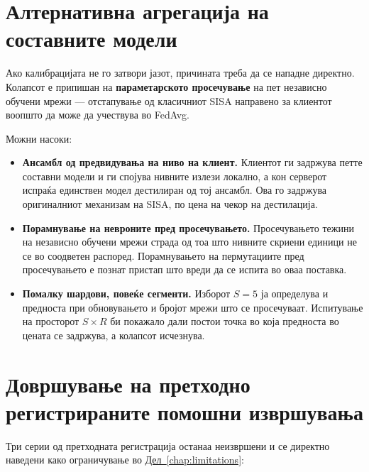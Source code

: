 \section{Алтернативна агрегација на составните модели}

Ако калибрацијата не го затвори јазот, причината треба да се нападне директно. Колапсот е
припишан на \textbf{параметарското просечување} на пет независно обучени мрежи --- отстапување од
класичниот SISA направено за клиентот воопшто да може да учествува во FedAvg.

Можни насоки:

\begin{itemize}
  \item \textbf{Ансамбл од предвидувања на ниво на клиент.} Клиентот ги задржува петте составни
  модели и ги спојува нивните излези локално, а кон серверот испраќа единствен модел
  дестилиран од тој ансамбл. Ова го задржува оригиналниот механизам на SISA, по цена на чекор
  на дестилација.
  \item \textbf{Порамнување на невроните пред просечувањето.} Просечувањето тежини на независно
  обучени мрежи страда од тоа што нивните скриени единици не се во соодветен распоред.
  Порамнувањето на пермутациите пред просечувањето е познат пристап што вреди да се испита во
  оваа поставка.
  \item \textbf{Помалку шардови, повеќе сегменти.} Изборот $S = 5$ ја определува и предноста при
  обновувањето и бројот мрежи што се просечуваат. Испитување на просторот $S \times R$ би
  покажало дали постои точка во која предноста во цената се задржува, а колапсот исчезнува.
\end{itemize}

\section{Довршување на претходно регистрираните помошни извршувања}

Три серии од претходната регистрација останаа неизвршени и се директно наведени како
ограничување во \hyperref[chap:limitations]{Дел~\ref*{chap:limitations}}:

